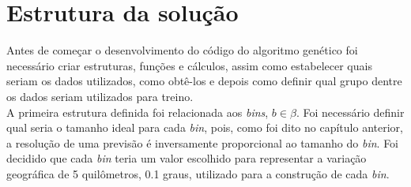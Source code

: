 \section{Estrutura da solução}
Antes de começar o desenvolvimento do código do algoritmo genético foi necessário criar estruturas, funções e cálculos, assim como estabelecer quais seriam os dados utilizados, como obtê-los e depois como definir qual grupo dentre os dados seriam utilizados para treino.\\

A primeira estrutura definida foi relacionada aos {\it bins}, $b \in \beta$. Foi necessário definir qual seria o tamanho ideal para cada {\it bin}, pois, como foi dito no capítulo anterior, a resolução de uma previsão é inversamente proporcional ao tamanho do {\it bin}. Foi decidido que cada {\it bin} teria um valor escolhido para representar a variação geográfica de 5 quilômetros, 0.1 graus, utilizado para a construção de cada {\it bin}.\\


